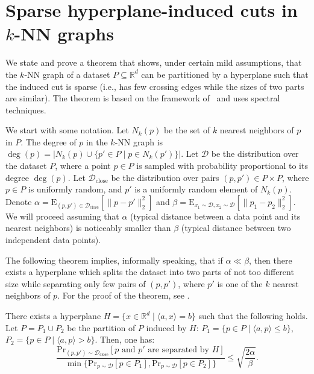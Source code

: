 \documentclass[11pt]{article}
\newcommand\Rbb{\ensuremath{\mathbb{R}}}
\begin{document}
\section{Sparse hyperplane-induced cuts in $k$-NN graphs}

We state and prove a theorem that shows, under certain mild assumptions, that the $k$-NN graph of a dataset $P \subseteq \Rbb^d$ can be partitioned
by a hyperplane such that the induced cut is sparse (i.e., has few crossing edges while the sizes of two parts are similar).
The theorem is based on the framework of~\cite{andoni2018data,andoni2018holder}
and uses spectral techniques.

We start with some notation.
Let $N_k(p)$ be the set of $k$ nearest neighbors of $p$ in $P$.
The degree of $p$ in the $k$-NN graph is $\deg(p) = |N_k(p)\cup\{p' \in P \mid p \in N_k(p')\}|$.
Let $\mathcal{D}$ be the distribution over the dataset $P$, where a point $p \in P$ is sampled with probability proportional to its degree $\deg(p)$.
Let $\mathcal{D}_{\mathrm{close}}$ be the distribution over pairs $(p, p') \in P \times P$,
where $p \in P$ is uniformly random, and $p'$ is a uniformly random element of $N_k(p)$. 
Denote $\alpha = \mathrm{E}_{(p, p') \in \mathcal{D}_{\mathrm{close}}}[\|p - p'\|_2^2]$
and $\beta = \mathrm{E}_{x_1 \sim \mathcal{D}, x_2 \sim \mathcal{D}}[\|p_1 - p_2\|_2^2]$.
We will proceed assuming that $\alpha$ (typical distance between a data point and its
nearest neighbors) is noticeably smaller than $\beta$ (typical distance between two
independent data points).

The following theorem implies, informally speaking, that if
$\alpha \ll \beta$, then there exists a hyperplane
which splits the dataset into two parts of not too different size
while separating only few pairs of $(p, p')$, where $p'$ is
one of the $k$ nearest neighbors of $p$.
For the proof of the theorem, see \cite{arxiv}.

\begin{theorem}
\label{piotr_spectral_thm}
There exists a hyperplane $H = \{x \in \Rbb^d \mid \langle a, x\rangle = b\}$ such that the following holds.
Let $P = P_1 \cup P_2$ be the partition of $P$ induced by $H$: $P_1 = \{p \in P \mid \langle a, p \rangle \leq b\}$,
$P_2 = \{p \in P \mid \langle a, p \rangle > b\}$. Then, one has:
\begin{equation}
\label{piotr_eqeqeq3}
\frac{\mathrm{Pr}_{(p, p') \sim \mathcal{D}_{\mathrm{close}}}[\mbox{$p$ and $p'$ are separated by $H$}]}{\min\{\mathrm{Pr}_{p \sim \mathcal{D}}[p \in P_1],\mathrm{Pr}_{p \sim \mathcal{D}}[p \in P_2]\}} \leq \sqrt{\frac{2 \alpha}{\beta}}.
\end{equation}
\end{theorem}
\end{document}
